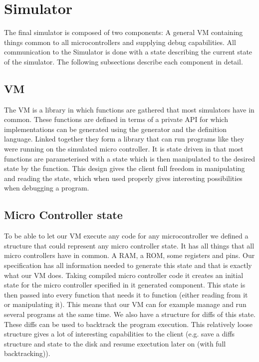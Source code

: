 \chapter{Simulator}
The final simulator is composed of two components: A general VM
containing things common to all microcontrollers and supplying debug
capabilities. All communication to the Simulator is done with a state
describing the current state of the simulator. The following
subsections describe each component in detail.

\section{VM}

The VM is a library in which functions are gathered that most simulators
have in common. These functions are defined in terms of a private API
for which implementations can be generated using the generator and the
definition language. Linked together they form a library that can run
programs like they were running on the simulated micro controller. It
is state driven in that most functions are parameterised with a state
which is then manipulated to the desired state by the function. This
design gives the client full freedom in manipulating and reading the
state, which when used properly gives interesting possibilities when
debugging a program.

\section{Micro Controller state}
To be able to let our VM execute any code for any microcontroller we
defined a structure that could represent any micro controller state. It
has all things that all micro controllers have in common. A RAM, a ROM,
some registers and pins. Our specification has all information needed
to generate this state and that is exactly what our VM does. Taking
compiled micro controller code it creates an initial state for the
micro controller specified in it generated component. This state is
then passed into every function that needs it to function (either
reading from it or manipulating it). This means that our VM can for
example manage and run several programs at the same time. We also have
a structure for diffs of this state. These diffs can be used to
backtrack the program execution. This relatively loose structure gives
a lot of interesting capabilities to the client (e.g. save a diffs
structure and state to the disk and resume exectution later on (with
full backtracking)).

